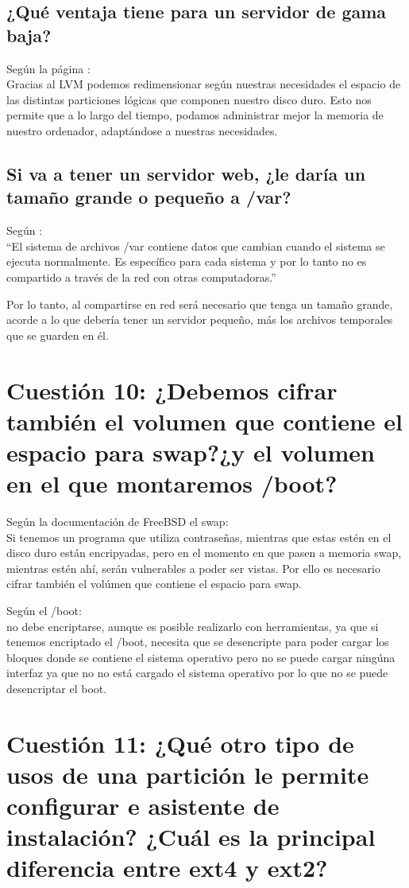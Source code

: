 \subsection{¿Qué ventaja tiene para un servidor de gama baja?}
Según la página \cite{small}:\\
Gracias al LVM podemos redimensionar según nuestras necesidades el espacio de las distintas particiones lógicas que componen nuestro disco duro. Esto nos permite que a lo largo del tiempo, podamos administrar mejor la memoria de nuestro ordenador, adaptándose a nuestras necesidades.
\subsection{Si va a tener un servidor web, ¿le daría un tamaño grande o pequeño a /var?}
Según \cite{var}:\\
\textquotedblleft El sistema de archivos /var contiene datos que cambian cuando el sistema se ejecuta normalmente. Es específico para cada sistema y por lo tanto no es compartido a través de la red con otras computadoras.\textquotedblright

Por lo tanto, al compartirse en red será necesario que tenga un tamaño grande, acorde a lo que debería tener un servidor pequeño, más los archivos temporales que se guarden en él.

\section{Cuestión 10: ¿Debemos cifrar también el volumen que contiene el espacio para swap?¿y el volumen en el que  montaremos /boot?}
Según la documentación de FreeBSD \cite{swapencr} el swap:\\
Si tenemos un programa que utiliza contraseñas, mientras que estas estén en el disco duro están encripyadas, pero en el momento en que pasen a memoria swap, mientras estén ahí, serán vulnerables a poder ser vistas. Por ello es necesario cifrar también el volúmen que contiene el espacio para swap. 

Según \cite{boot} el /boot:\\
no debe encriptarse, aunque es posible realizarlo con herramientas, ya que si tenemos encriptado el /boot, necesita que se desencripte para poder cargar los bloques donde se contiene el sistema operativo pero no se puede cargar ningúna interfaz ya que no no está cargado el sistema operativo por lo que no se puede desencriptar el boot.

\section{Cuestión 11: ¿Qué otro tipo de usos de una partición le permite configurar e asistente de instalación? ¿Cuál es la principal diferencia entre ext4 y ext2?}

